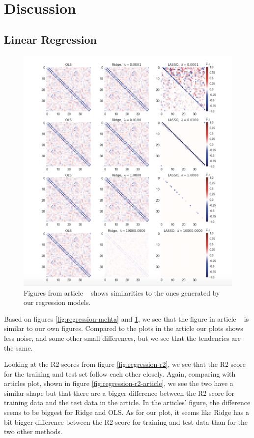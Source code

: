 \section{Discussion}
\subsection{Linear Regression}
\begin{figure}[H]
    \centering
\includegraphics[width = 0.7\paperwidth]{figures/Regression_metha_article.png} 
\caption{Figures from article ~\cite{HighBias} shows similarities to the ones generated by our regression models.} 
\label{fig:regression-mehta-article}
\end{figure}
Based on figures \ref{fig:regression-mehta} and 
\ref{fig:regression-mehta-article}, we see that the figure in article 
~\cite{HighBias} is similar to our own figures. 
Compared to the plots in the article our plots shows less noise, 
and some other small differences, but we see that the tendencies are the same.

Looking at the R2 scores from figure \ref{fig:regression-r2}, we see 
that the R2 score for the training and test set follow each other closely. 
Again, comparing with articles plot, shown in figure 
\ref{fig:regression-r2-article}, we see the two have a similar shape 
but that there are a bigger difference between the R2 score for training 
data and the test data in the article. 
In the articles' figure, the difference seems to be biggest for Ridge and 
OLS. As for our plot, it seems like Ridge has a bit bigger difference 
between the R2 score for training and test data than for the two other 
methods.

